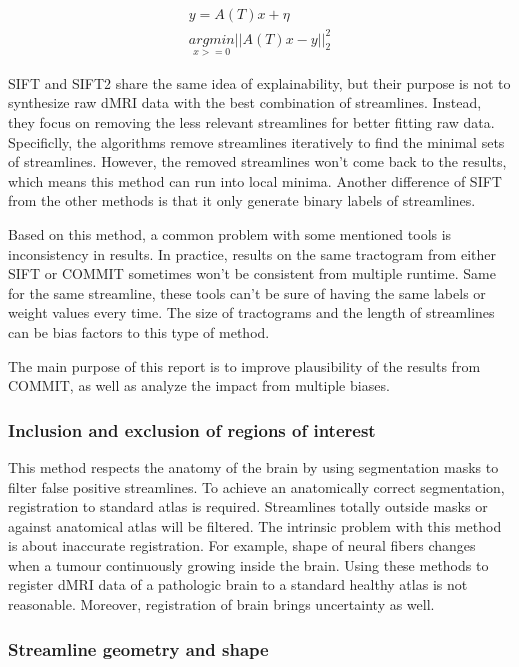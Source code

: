 \begin{gather}\label{explaindiffusion}  
    y = A(T)x + \eta\\
    \underset{x>=0}{argmin}||A(T)x-y||_{2}^{2}
\end{gather}



SIFT \cite*{smithSIFTSphericaldeconvolutionInformed2013} and SIFT2 \cite*{smithSIFT2EnablingDense2015} share the same idea of explainability,
but their purpose is not to synthesize raw dMRI data with the best combination of streamlines. 
Instead, they focus on removing the less relevant streamlines for better fitting raw data.
Specificlly, the algorithms remove streamlines iteratively to find the minimal sets of streamlines.
However, the removed streamlines won't come back to the results, which means this method can run into local minima.
Another difference of SIFT from the other methods is that it only generate binary labels of streamlines.


Based on this method, a common problem with some mentioned tools is inconsistency in results. 
In practice, results on the same tractogram from either SIFT or COMMIT
sometimes won't be consistent from multiple runtime. 
Same for the same streamline, these tools can't be sure of having the same labels or weight values every time.
The size of tractograms and the length of streamlines can be bias factors to this type of method.

The main purpose of this report is to improve plausibility of the results from COMMIT, 
as well as analyze the impact from multiple biases.


\subsubsection{Inclusion and exclusion of regions of interest}
This method respects the anatomy of the brain by using segmentation masks to filter false positive streamlines. 
To achieve an anatomically correct segmentation, registration to standard atlas is required. 
Streamlines totally outside masks or against anatomical atlas will be filtered. 
The intrinsic problem with this method is about inaccurate registration.
For example, shape of neural fibers changes when a tumour continuously growing inside the brain. 
Using these methods to register dMRI data of a pathologic brain to a standard healthy atlas is not reasonable.
Moreover, registration of brain brings uncertainty as well.


\subsubsection{Streamline geometry and shape}

